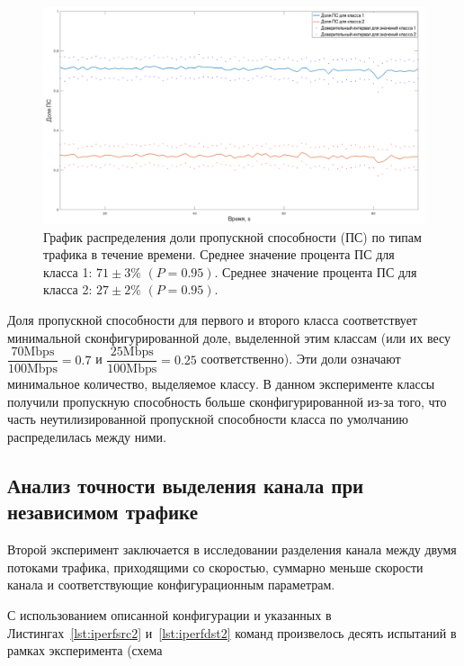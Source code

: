             \begin{figure}[ht!]
            	\center
            	\includegraphics[width=0.9\linewidth]{./plotc.png} %
            	\caption{График распределения доли пропускной способности (ПС) по типам трафика в течение времени.
						 Среднее значение процента ПС для класса 1: $71 \pm 3 \%$ $(P = 0.95)$.
                         Среднее значение процента ПС для класса 2: $27 \pm 2 \%$ $(P = 0.95)$.
                        }
    			\label{pic:plot}
            \end{figure}

			Доля пропускной
			способности для первого и второго класса соответствует минимальной сконфигурированной доле, выделенной
			этим классам (или их весу $\dfrac{\text{70Mbps}}{\text{100Mbps}} = 0.7$ и
            $\dfrac{\text{25Mbps}}{\text{100Mbps}} = 0.25$ соответственно).
			Эти доли означают минимальное количество, выделяемое классу. В данном
			эксперименте классы получили пропускную способность больше сконфигурированной
			из-за того, что часть неутилизированной пропускной способности класса по умолчанию
			распределилась между ними.

		\subsection{Анализ точности выделения канала при независимом трафике}

			Второй эксперимент заключается в исследовании разделения канала между
			двумя потоками трафика, приходящими со скоростью, суммарно меньше
			скорости канала и соответствующие конфигурационным параметрам.

    		С использованием описанной конфигурации и указанных в Листингах~\ref{lst:iperfsrc2} и~\ref{lst:iperfdst2}
			команд произвелось десять испытаний в рамках эксперимента (схема

